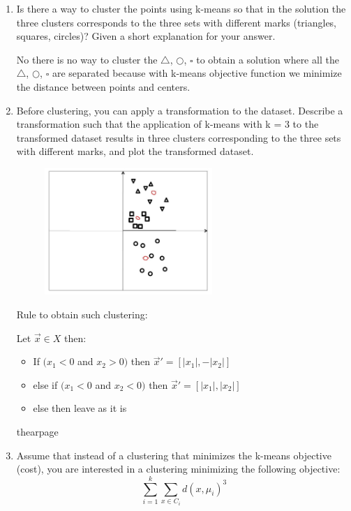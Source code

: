 \documentclass[a4paper,11pt,oneside]{book}
\begin{document}
    \begin{enumerate}
    \item Is there a way to cluster the points using k-means so that in the solution the three clusters corresponds to the three sets with different marks (triangles, squares, circles)? Given a short explanation for your answer.
        \begin{solution}
            No there is no way to cluster the $\triangle$, $\bigcirc$, $\square$ to obtain a solution where all the $\triangle$, $\bigcirc$, $\square$ are separated because with k-means objective function we minimize the distance between points and centers.
        \end{solution}
    \item Before clustering, you can apply a transformation to the dataset. Describe a transformation such that the application of k-means with k = 3 to the transformed dataset results in three clusters corresponding to the three sets with different marks, and plot the transformed dataset.
        \begin{solution}
                \begin{figure}[H]
                    \centering
                    \includegraphics[width=0.6\textwidth,height=0.4\textheight,keepaspectratio]{images/2_2_1_July_2019.png}
                    \end{figure}
    
            Rule to obtain such clustering:
            
            Let $\vec{x} \in X$ then:
            \begin{itemize}
            \item If $(x_1 < 0$ and $x_2 > 0)$ then $\vec{x}' = [|x_1|, -|x_2|]$
            \item else if $(x_1 < 0$ and $x_2 < 0)$ then $\vec{x}' = [|x_1|, |x_2|]$
            \item else then leave as it is
            \end{itemize}
        \end{solution}
    \clearpage thearpage
    \item Assume that instead of a clustering that minimizes the k-means objective (cost), you are interested in a clustering minimizing the following objective:
        $$\sum_{i=1}^k \sum_{x\in C_i} d(x,\mu_i)^3$$


\end{enumerate}
\end{document}
